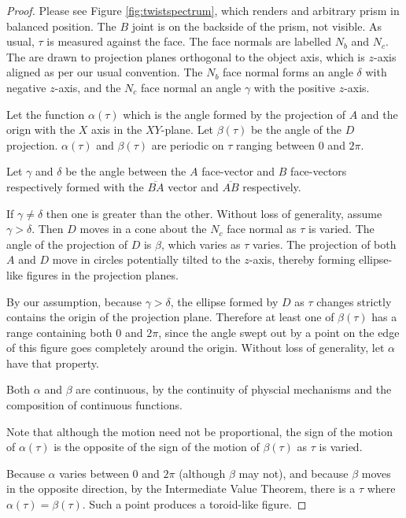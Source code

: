 \documentclass[11pt]{article}
\begin{document}
{\begin{proof}
  Please see Figure \ref{fig:twistspectrum}, which renders and arbitrary
  prism in balanced position. The $B$ joint is on the backside of the
  prism, not visible. As usual, $\tau$ is measured against the
  face. The face normals are labelled $N_b$ and $N_c$. The are drawn
  to projection planes orthogonal to the object axis, which is $z$-axis
  aligned as per our usual convention. The $N_b$ face normal forms
  an angle $\delta$ with negative $z$-axis, and the $N_c$ face normal
  an angle $\gamma$ with the positive $z$-axis.

  Let the function $\alpha(\tau)$ which is the angle formed by the
  projection of $A$ and the orign with the $X$ axis in the $XY$-plane.
  Let $\beta(\tau)$ be the angle of the $D$ projection. $\alpha(\tau)$
  and $\beta(\tau)$ are periodic on $\tau$ ranging between $0$ and
  $2\pi$.

    Let $\gamma$ and $\delta$ be the angle between the $A$ face-vector and
    $B$ face-vectors respectively formed with the
    $\overline{BA}$ vector and $\overline{AB}$ respectively.

    If $\gamma \neq \delta$ then one is greater than the other.
    Without loss of generality, assume $\gamma > \delta$.
    Then $D$ moves in a cone
    about the $N_c$ face normal as $\tau$ is varied. The
    angle of the projection of $D$ is $\beta$, which varies as $\tau$
    varies.
    The projection of both $A$ and $D$ move in circles
    potentially tilted to the $z$-axis, thereby
    forming ellipse-like figures in the projection planes.

    By our assumption, because $\gamma > \delta$, the
    ellipse formed by $D$ as $\tau$ changes
    strictly contains the origin of the projection plane.
    Therefore at least one of $\beta(\tau)$  has a range
    containing both $0$ and $2\pi$, since the angle swept out by
    a point on the edge of this figure goes completely around the origin.
    Without loss of generality, let $\alpha$ have that property.

    Both $\alpha$ and $\beta$ are continuous, by the continuity of
    physcial mechanisms and the composition of continuous functions.

    Note that although the motion need not be proportional, the sign
    of the motion of $\alpha(\tau)$ is the opposite of the sign of the
    motion of $\beta(\tau)$ as $\tau$ is varied.

    Because $\alpha$ varies between $0$ and $2\pi$ (although
    $\beta$ may not), and because $\beta$ moves in the opposite direction,
    by the Intermediate Value Theorem, there is a $\tau$ where
    $\alpha(\tau) = \beta(\tau)$. Such a point produces a toroid-like
    figure.


\end{proof}}
\end{document}
